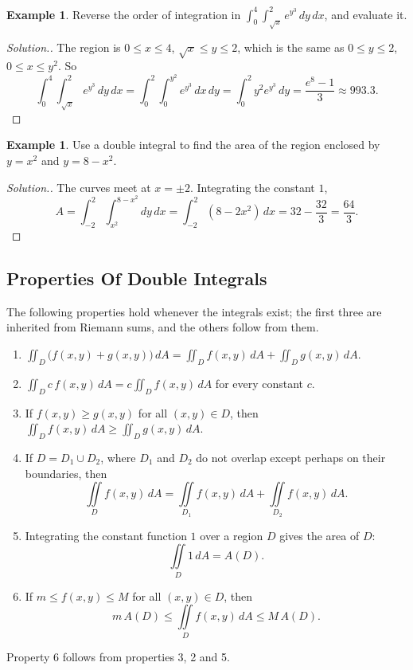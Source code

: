 \documentclass[11pt,a4paper]{article}
\theoremstyle{definition}
\newtheorem{exa}[thm]{Example}
\newenvironment{solution}
  {\renewcommand{\qedsymbol}{}\begin{proof}[\textit{Solution}.]}
  {\end{proof}}
\begin{document}
\begin{exa}
\label{ex:reverseexp}
Reverse the order of integration in $\int_0^4\int_{\sqrt x}^2 e^{y^3}\,dy\,dx$,
and evaluate it.
\end{exa}

\begin{solution}
The region is $0\leq x\leq 4$, $\sqrt x\leq y\leq 2$, which is the same as
$0\leq y\leq 2$, $0\leq x\leq y^2$. So
\[\int_0^4\int_{\sqrt x}^2 e^{y^3}\,dy\,dx = \int_0^2\int_0^{y^2}e^{y^3}\,dx\,dy =
\int_0^2 y^2e^{y^3}\,dy = \frac{e^8 - 1}{3}\approx 993.3 .\]
\end{solution}

\begin{exa}
\label{ex:areaD}
Use a double integral to find the area of the region enclosed by $y = x^2$ and
$y = 8 - x^2$.
\end{exa}

\begin{solution}
The curves meet at $x = \pm 2$. Integrating the constant $1$,
\[A = \int_{-2}^2\int_{x^2}^{8 - x^2}dy\,dx = \int_{-2}^2 (8 - 2x^2)\,dx = 32 -
\frac{32}{3} = \frac{64}{3} .\]
\end{solution}

{\color[wave]{485}\subsection{Properties Of Double Integrals}}

The following properties hold whenever the integrals exist; the first three are
inherited from Riemann sums, and the others follow from them.
\begin{enumerate}
\item $\iint_D \big(f(x,y) + g(x,y)\big)\,dA = \iint_D f(x,y)\,dA +
\iint_D g(x,y)\,dA$.

\item $\iint_D c\, f(x,y)\,dA = c \iint_D f(x,y)\,dA$ for every constant $c$.

\item If $f(x,y)\geq g(x,y)$ for all $(x,y)\in D$, then
$\iint_D f(x,y)\,dA \geq \iint_D g(x,y)\,dA$.

\item If $D = D_1\cup D_2$, where $D_1$ and $D_2$ do not overlap except perhaps
on their boundaries, then
\[\iint\limits_D f(x,y)\,dA  = \iint\limits_{D_1} f(x,y)\,dA  +
\iint\limits_{D_2} f(x,y)\,dA .\]

\item Integrating the constant function $1$ over a region $D$ gives the area of
$D$:
\[\iint\limits_D 1 \,dA = A(D) .\]

\item If $m\leq f(x,y) \leq M$ for all $(x,y) \in D$, then
\[m\,A(D)\leq \iint\limits_D f(x,y)\,dA \leq M\, A(D) .\]
\end{enumerate}
Property 6 follows from properties 3, 2 and 5.
\end{document}
